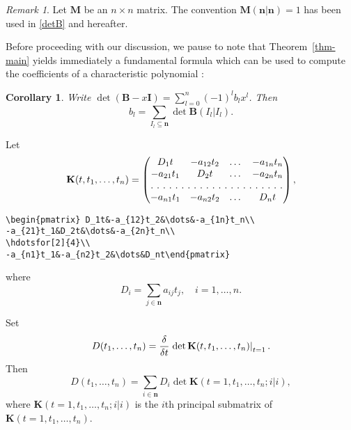 \documentclass{article}
\newtheorem{cor}[thm]{Corollary}
\theoremstyle{definition}
\theoremstyle{remark}
\newtheorem{rem}{Remark}[section]
\newcommand{\thmref}[1]{Theorem~\ref{#1}}
\newcommand{\eval}[2][\right]{\relax
  \ifx#1\right\relax \left.\fi#2#1\rvert}
\begin{document}
\begin{rem}
Let $\mathbf{M}$ be an $n\times n$ matrix. The convention
$\mathbf{M}(\mathbf{n}|\mathbf{n})=1$ has been used in \eqref{detB} and
hereafter.
\end{rem}

Before proceeding with our discussion, we pause to note that
\thmref{thm-main} yields immediately a fundamental formula which can be
used to compute the coefficients of a characteristic polynomial
\cite{mami:matrixth}:
\begin{cor}\label{BI}
Write $\det(\mathbf{B}-x\mathbf{I})=\sum^n_{l =0}(-1)
^l b_l x^l $. Then
\begin{equation}\label{bl-sum}
b_l =\sum_{I_l \subseteq\mathbf{n}}\det\mathbf{B}(I_l |I_l ).
\end{equation}
\end{cor}
Let
\begin{equation}
\mathbf{K}(t,t_1,\dots,t_n)
=\begin{pmatrix} D_1t&-a_{12}t_2&\dots&-a_{1n}t_n\\
-a_{21}t_1&D_2t&\dots&-a_{2n}t_n\\
\hdotsfor[2]{4}\\
-a_{n1}t_1&-a_{n2}t_2&\dots&D_nt\end{pmatrix},
\end{equation}
\begin{verbatim}
\begin{pmatrix} D_1t&-a_{12}t_2&\dots&-a_{1n}t_n\\
-a_{21}t_1&D_2t&\dots&-a_{2n}t_n\\
\hdotsfor[2]{4}\\
-a_{n1}t_1&-a_{n2}t_2&\dots&D_nt\end{pmatrix}
\end{verbatim}
where
\begin{equation}
D_i=\sum_{j\in\mathbf{n}}a_{ij}t_j,\quad i=1,\dots,n.
\end{equation}

Set
\begin{equation*}
D(t_1,\dots,t_n)=\frac{\delta}{\delta t}\eval{\det\mathbf{K}(t,t_1,\dots,t_n)
}_{t=1}.
\end{equation*}
Then
\begin{equation}\label{sum-Di}
D(t_1,\dots,t_n)
=\sum_{i\in\mathbf{n}}D_i\det\mathbf{K}(t=1,t_1,\dots,t_n; i|i),
\end{equation}
where $\mathbf{K}(t=1,t_1,\dots,t_n; i|i)$ is the $i$th principal
submatrix of $\mathbf{K}(t=1,t_1,\dots,t_n)$.
\end{document}
